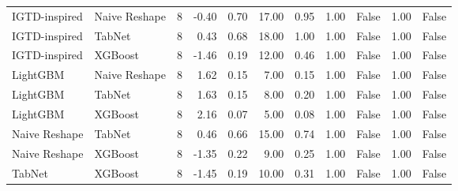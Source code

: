 \begin{tabular}{llrrrrrrlrl}
IGTD-inspired & Naive Reshape & 8 & -0.40 & 0.70 & 17.00 & 0.95 & 1.00 & False & 1.00 & False \\
IGTD-inspired & TabNet & 8 & 0.43 & 0.68 & 18.00 & 1.00 & 1.00 & False & 1.00 & False \\
IGTD-inspired & XGBoost & 8 & -1.46 & 0.19 & 12.00 & 0.46 & 1.00 & False & 1.00 & False \\
LightGBM & Naive Reshape & 8 & 1.62 & 0.15 & 7.00 & 0.15 & 1.00 & False & 1.00 & False \\
LightGBM & TabNet & 8 & 1.63 & 0.15 & 8.00 & 0.20 & 1.00 & False & 1.00 & False \\
LightGBM & XGBoost & 8 & 2.16 & 0.07 & 5.00 & 0.08 & 1.00 & False & 1.00 & False \\
Naive Reshape & TabNet & 8 & 0.46 & 0.66 & 15.00 & 0.74 & 1.00 & False & 1.00 & False \\
Naive Reshape & XGBoost & 8 & -1.35 & 0.22 & 9.00 & 0.25 & 1.00 & False & 1.00 & False \\
TabNet & XGBoost & 8 & -1.45 & 0.19 & 10.00 & 0.31 & 1.00 & False & 1.00 & False \\
\bottomrule
\end{tabular}
